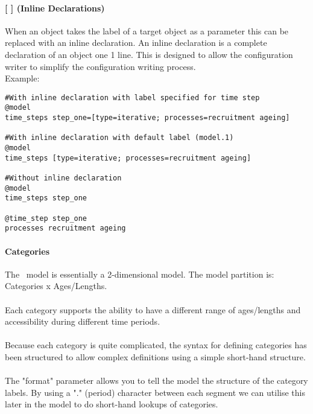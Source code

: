 \paragraph*{[ ] (Inline Declarations)}
When an object takes the label of a target object as a parameter this can be replaced with an inline declaration. An inline declaration is a complete declaration of an object one 1 line. This is designed to allow the configuration writer to simplify the configuration writing process.\\
Example:
{\small{\begin{verbatim}
#With inline declaration with label specified for time step
@model
time_steps step_one=[type=iterative; processes=recruitment ageing]

#With inline declaration with default label (model.1)
@model
time_steps [type=iterative; processes=recruitment ageing]

#Without inline declaration
@model
time_steps step_one

@time_step step_one
processes recruitment ageing
\end{verbatim}}}

\paragraph*{Categories}
The \CNAME\ model is essentially a 2-dimensional model. The model partition is:\\
Categories x Ages/Lengths.
\\\\
Each category supports the ability to have a different range of ages/lengths and accessibility during different time periods.
\\\\
Because each category is quite complicated, the syntax for defining categories has been structured to allow complex definitions using a simple short-hand structure.
\\\\
The "format" parameter allows you to tell the model the structure of the category labels. By using a "." (period) character between each segment we can utilise this later in the model to do short-hand lookups of categories.


